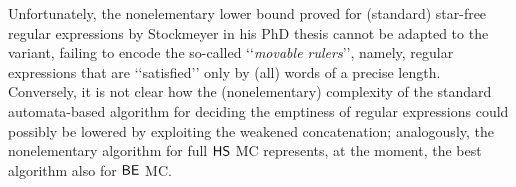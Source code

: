 Unfortunately, the nonelementary lower bound proved for (standard) star-free regular expressions by Stockmeyer in his PhD thesis \cite{stockmeyer1974} cannot be adapted to the variant, failing to encode the so-called \lq\lq \emph{movable rulers}\rq\rq, 
namely, regular expressions that are \lq\lq satisfied\rq\rq{} only by (all) words of a precise length.
Conversely, it is not clear how the (nonelementary) complexity of the standard automata-based algorithm for deciding the emptiness of regular expressions could possibly be lowered by exploiting the weakened concatenation; analogously, the nonelementary algorithm for full $\text{\sffamily HS}$ MC represents, at the moment, the best algorithm also for $\mathsf{BE}$ MC. 
